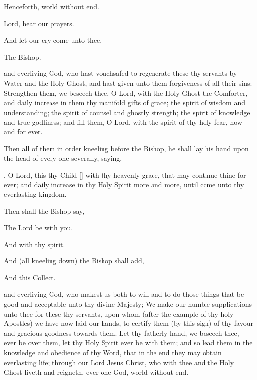  Henceforth, world without end.

 Lord, hear our prayers.

 And let our cry come unto thee.

\begin{rubric}
The Bishop.
\end{rubric}


 and everliving God, who hast vouchsafed to regenerate these thy servants by Water and the Holy Ghost, and hast given unto them forgiveness of all their sins: Strengthen them, we beseech thee, O Lord, with the Holy Ghost the Comforter, and daily increase in them thy manifold gifts of grace; the spirit of wisdom and understanding; the spirit of counsel and ghostly strength; the spirit of knowledge and true godliness; and fill them, O Lord, with the spirit of thy holy fear, now and for ever.

\begin{rubric}
Then all of them in order kneeling before the Bishop, he shall lay his hand upon the head of every one severally, saying,
\end{rubric}

, O Lord, this thy Child [] with thy heavenly grace, that  may continue thine for ever; and daily increase in thy Holy Spirit more and more, until  come unto thy everlasting kingdom.

\begin{rubric}
Then shall the Bishop say,
\end{rubric}

The Lord be with you.

 And with thy spirit.

\begin{rubric}
And (all kneeling down) the Bishop shall add,
\end{rubric}




\newpage

\begin{rubric}
And this Collect.
\end{rubric}

 and everliving God, who makest us both to will and to do those things that be good and acceptable unto thy divine Majesty; We make our humble supplications unto thee for these thy servants, upon whom (after the example of thy holy Apostles) we have now laid our hands, to certify them (by this sign) of thy favour and gracious goodness towards them. Let thy fatherly hand, we beseech thee, ever be over them, let thy Holy Spirit ever be with them; and so lead them in the knowledge and obedience of thy Word, that in the end they may obtain everlasting life; through our Lord Jesus Christ, who with thee and the Holy Ghost liveth and reigneth, ever one God, world without end.

